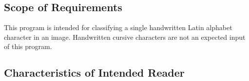 \documentclass[12pt]{article}
\begin{document}

\subsection{Scope of Requirements} 

This program is intended for classifying a single handwritten Latin alphabet
character in an image. Handwritten cursive characters are not an expected input
of this program.



\subsection{Characteristics of Intended Reader} \label{sec_IntendedReader}
\end{document}
